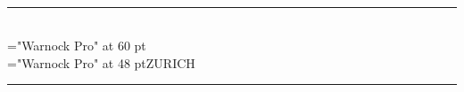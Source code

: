 \documentclass[a4paper,11pt,landscape]{article}
\begin{document}
\pagestyle{empty}
\begin{center}
\mbox{}\\[2.5in]
\hrule\mbox{}
\mbox{}\\[1ex]
\mbox{}
{\font\x="Warnock Pro" at 60 pt\\[0.5cm]}
\mbox{}
{\font\x="Warnock Pro" at 48 pt\x \uppercase{Zurich}\\[0.3cm]}
\hrule

\end{center}
\end{document}
